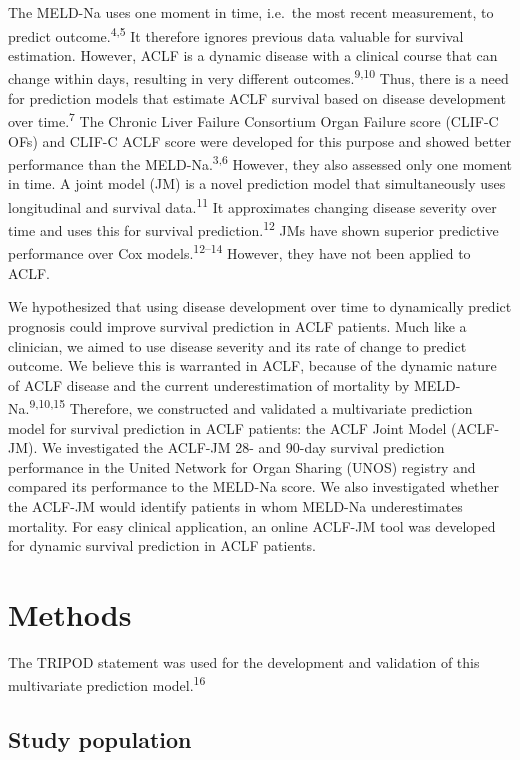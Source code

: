 \documentclass[11pt,english,]{book} %
\begin{document}
The MELD-Na uses one moment in time, i.e.~the most recent measurement, to predict outcome.\textsuperscript{4,5} It therefore ignores previous data valuable for survival estimation. However, ACLF is a dynamic disease with a clinical course that can change within days, resulting in very different outcomes.\textsuperscript{9,10} Thus, there is a need for prediction models that estimate ACLF survival based on disease development over time.\textsuperscript{7} The Chronic Liver Failure Consortium Organ Failure score (CLIF-C OFs) and CLIF-C ACLF score were developed for this purpose and showed better performance than the MELD-Na.\textsuperscript{3,6} However, they also assessed only one moment in time. A joint model (JM) is a novel prediction model that simultaneously uses longitudinal and survival data.\textsuperscript{11} It approximates changing disease severity over time and uses this for survival prediction.\textsuperscript{12} JMs have shown superior predictive performance over Cox models.\textsuperscript{12--14} However, they have not been applied to ACLF.

We hypothesized that using disease development over time to dynamically predict prognosis could improve survival prediction in ACLF patients. Much like a clinician, we aimed to use disease severity and its rate of change to predict outcome. We believe this is warranted in ACLF, because of the dynamic nature of ACLF disease and the current underestimation of mortality by MELD-Na.\textsuperscript{9,10,15} Therefore, we constructed and validated a multivariate prediction model for survival prediction in ACLF patients: the ACLF Joint Model (ACLF-JM). We investigated the ACLF-JM 28- and 90-day survival prediction performance in the United Network for Organ Sharing (UNOS) registry and compared its performance to the MELD-Na score. We also investigated whether the ACLF-JM would identify patients in whom MELD-Na underestimates mortality. For easy clinical application, an online ACLF-JM tool was developed for dynamic survival prediction in ACLF patients.

\hypertarget{methods-3}{%
\section*{Methods}\label{methods-3}}

The TRIPOD statement was used for the development and validation of this multivariate prediction model.\textsuperscript{16}

\hypertarget{study-population-2}{%
\subsection*{Study population}\label{study-population-2}}
\end{document}
